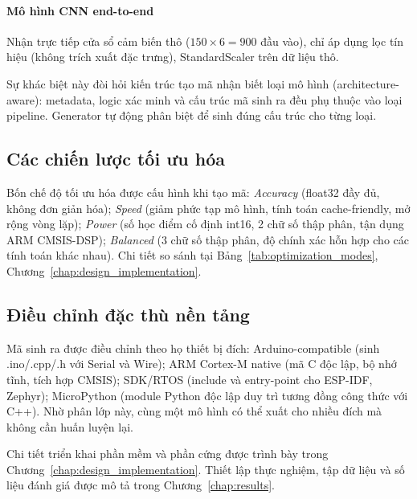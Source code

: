 \paragraph{Mô hình CNN end-to-end}
Nhận trực tiếp cửa sổ cảm biến thô ($150 \times 6 = 900$ đầu vào), chỉ áp dụng lọc tín hiệu (không trích xuất đặc trưng), StandardScaler trên dữ liệu thô.

Sự khác biệt này đòi hỏi kiến trúc tạo mã nhận biết loại mô hình (architecture-aware): metadata, logic xác minh và cấu trúc mã sinh ra đều phụ thuộc vào loại pipeline. Generator tự động phân biệt để sinh đúng cấu trúc cho từng loại.

\subsection{Các chiến lược tối ưu hóa}
Bốn chế độ tối ưu hóa được cấu hình khi tạo mã: \textit{Accuracy} (float32 đầy đủ, không đơn giản hóa); \textit{Speed} (giảm phức tạp mô hình, tính toán cache-friendly, mở rộng vòng lặp); \textit{Power} (số học điểm cố định int16, 2 chữ số thập phân, tận dụng ARM CMSIS-DSP); \textit{Balanced} (3 chữ số thập phân, độ chính xác hỗn hợp cho các tính toán khác nhau). Chi tiết so sánh tại Bảng~\ref{tab:optimization_modes}, Chương~\ref{chap:design_implementation}.

\subsection{Điều chỉnh đặc thù nền tảng}
Mã sinh ra được điều chỉnh theo họ thiết bị đích: Arduino-compatible (sinh .ino/.cpp/.h với Serial và Wire); ARM Cortex-M native (mã C độc lập, bộ nhớ tĩnh, tích hợp CMSIS); SDK/RTOS (include và entry-point cho ESP-IDF, Zephyr); MicroPython (module Python độc lập duy trì tương đồng công thức với C++). Nhờ phân lớp này, cùng một mô hình có thể xuất cho nhiều đích mà không cần huấn luyện lại.

Chi tiết triển khai phần mềm và phần cứng được trình bày trong Chương~\ref{chap:design_implementation}. Thiết lập thực nghiệm, tập dữ liệu và số liệu đánh giá được mô tả trong Chương~\ref{chap:results}.
